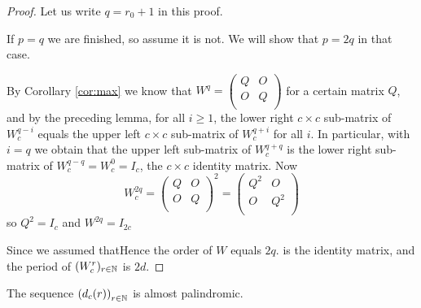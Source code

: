 \begin{proof}
  Let us write $q=r_0+1$ in this proof.

  If $p=q$ we are finished, so assume it is not. We will show that $p=2q$ in
  that case.

  By Corollary \ref{cor:max} we know that 
  $W^{q}=\left(\begin{smallmatrix} Q & O \\ O & Q \\\end{smallmatrix}\right)$
  for a certain matrix $Q$, and by the preceding lemma, for all $i\geq 1$,
  the lower right $c\times c$ sub-matrix of
  $W_{c}^{q-i}$ equals the upper left $c\times c$ sub-matrix of $W_{c}^{q+i}$
  for all $i$. In particular, with $i=q$ we obtain that
  the upper left sub-matrix of $W_{c}^{q+q}$ is the lower right sub-matrix of
  $W_{c}^{q-q} = W_{c}^{0} = I_{c}$, the $c\times c$ identity matrix.
  Now
  \[
  W_{c}^{2q}
  =
  \left(
  \begin{array}{cc}
    Q & O \\
    O & Q \\
  \end{array}
  \right)^{2}
  =
  \left(
  \begin{array}{cc}
    Q^{2} & O \\
    O & Q^{2} \\
  \end{array}
  \right)
  \]
  so $Q^{2}=I_{c}$ and $W^{2q}=I_{2c}$
  
  Since we assumed thatHence the order of $W$ equals $2q$.
  is the identity matrix, and the period of $(W_{c}^{r})_{r\in\mathbb{N}}$ is $2d$.
\end{proof}

\begin{theorem}[Observation 5]
  The sequence $\left(d_{c}(r)\right)_{r\in\mathbb{N}}$
  is almost palindromic.
\end{theorem}

